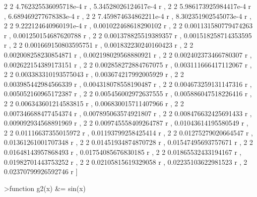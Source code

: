 \documentclass[a4paper,10pt]{article}
\begin{document}
\begin{eulernotebook}
\begin{euleroutput}
                        2                       2
  4.762325536095718e-4 r , 5.34528026124617e-4 r , 
                        2                        2
  5.986173925984417e-4 r , 6.689469277678383e-4 r , 
                        2                        2
  7.459874634862211e-4 r , 8.302351902545073e-4 r , 
                        2                        2
  9.222124640960191e-4 r , 0.001022468618290102 r , 
                        2                        2
  0.001131580779474263 r , 0.001250154687620788 r , 
                        2                        2
  0.001378825519389357 r , 0.001518258714353595 r , 
                        2                        2
  0.001669150803595751 r , 0.001832230240160423 r , 
                        2                        2
  0.002008258230854871 r , 0.002198029568880921 r , 
                        2                        2
  0.002402373466780307 r , 0.002622154389173151 r , 
                        2                        2
  0.002858272884767075 r , 0.003111666417112067 r , 
                        2                        2
  0.003383310193575043 r , 0.003674217992005929 r , 
                        2                        2
  0.003985442984566339 r , 0.004318078558190487 r , 
                        2                        2
  0.004673259131147316 r , 0.005052160965172387 r , 
                        2                        2
  0.005456002972637555 r , 0.005886047518226416 r , 
                        2                        2
  0.006343601214583815 r , 0.006830015711407966 r , 
                        2                        2
  0.007346688477454374 r , 0.007895063574921807 r , 
                        2                        2
  0.008476632425691433 r , 0.009092934568891969 r , 
                        2                       2
  0.009745558409264787 r , 0.01043614195580549 r , 
                       2                       2
  0.01116637355015972 r , 0.01193799258425414 r , 
                       2                       2
  0.01275279020664547 r , 0.01361261001707348 r , 
                       2                       2
  0.01451934874870728 r , 0.01547495693757671 r , 
                       2                       2
  0.01648143957868493 r , 0.01754085676830185 r , 
                       2                       2
  0.01865532433194167 r , 0.01982701443753252 r , 
                       2                       2
  0.02105815619329058 r , 0.02235103622981523 r , 
                       2
  0.02370799926592746 r ]
  
\end{euleroutput}
\begin{eulerprompt}
>function g2(x) &= sin(x)
\end{eulerprompt}
\begin{euleroutput}
  

\end{euleroutput}
\end{eulernotebook}
\end{document}
